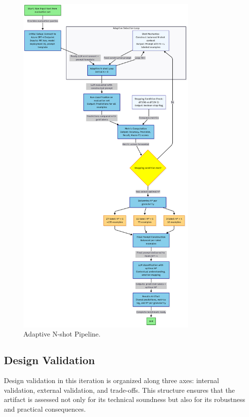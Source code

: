 \begin{figure}[H]
  \centering
  \includegraphics[width=0.8\textwidth]{Images/ContextLearning.png}
  \caption[Adaptive N-Shot Pipeline Flowchart]{Adaptive N-shot Pipeline.}
  \label{fig:nshot-pipeline}
\end{figure}

\subsection{Design Validation}

Design validation in this iteration is organized along three axes: internal validation, external validation, and trade-offs. This structure ensures that the artifact is assessed not only for its technical soundness but also for its robustness and practical consequences.  

